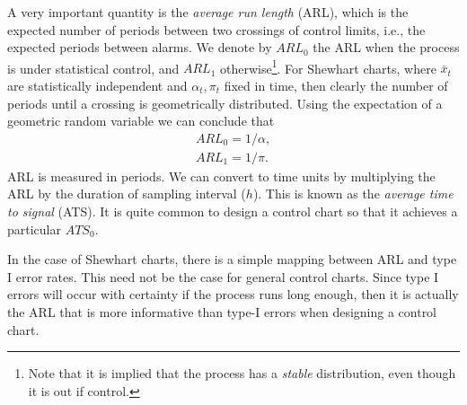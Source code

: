 A very important quantity is the \emph{average run length} (ARL), which is the expected number of periods between two crossings of control limits, i.e., the expected periods between alarms. 
We denote by $ARL_0$ the ARL when the process is under statistical control, and $ARL_1$ otherwise\footnote{Note that it is implied that the process has a \emph{stable} distribution, even though it is out if control.}. 
For Shewhart charts, where $\bar{x}_t$ are statistically independent and $\alpha_t,\pi_t$ fixed in time, then clearly the number of periods until a crossing is geometrically distributed. Using the expectation of a geometric random variable we can conclude that 
\begin{align}
	ARL_0=1/\alpha \label{eq:arl_0}, \\
	ARL_1=1/\pi \label{eq:arl_1}.
\end{align}
ARL is measured in periods. 
We can convert to time units by multiplying the ARL by the duration of sampling interval ($h$).
This is known as the \emph{average time to signal} (ATS).
It is quite common to design a control chart so that it achieves a particular $ATS_0$.

\begin{remark}
In the case of Shewhart charts, there is a simple mapping between ARL and type I error rates.
This need not be the case for general control charts. 
Since type I errors will occur with certainty if the process runs long enough, then it is actually the ARL that is more informative than type-I errors when designing a control chart.
\end{remark}


